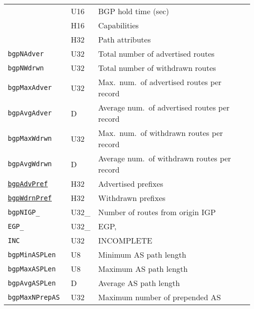 \documentclass[documentation]{subfiles}
\begin{document}
\begin{longtable}{>{\tt}lll>{\tt\small}l}
    \nameref{bgpHTime}                  & U16          & BGP hold time (sec)                           & \\
    \nameref{bgpCaps}                   & H16          & Capabilities                                  & \\
    \nameref{bgpPAttr}                  & H32          & Path attributes                               & \\
    bgpNAdver                           & U32          & Total number of advertised routes             & \\
    bgpNWdrwn                           & U32          & Total number of withdrawn routes              & \\
    bgpMaxAdver                         & U32          & Max.\ num.\ of advertised routes per record   & \\
    bgpAvgAdver                         & D            & Average num.\ of advertised routes per record & \\
    bgpMaxWdrwn                         & U32          & Max.\ num.\ of withdrawn routes per record    & \\
    bgpAvgWdrwn                         & D            & Average num.\ of withdrawn routes per record  & \\
    \hyperref[bgpPrefMask]{bgpAdvPref}  & H32          & Advertised prefixes                           & \\
    \hyperref[bgpPrefMask]{bgpWdrnPref} & H32          & Withdrawn prefixes                            & \\
    bgpNIGP\_                           & U32\_        & Number of routes from origin IGP              & \\
    \qquad EGP\_                        & \qquad U32\_ & \qquad EGP,                                   & \\
    \qquad INC                          & \qquad U32   & \qquad INCOMPLETE                             & \\
    bgpMinASPLen                        & U8           & Minimum AS path length                        & \\
    bgpMaxASPLen                        & U8           & Maximum AS path length                        & \\
    bgpAvgASPLen                        & D            & Average AS path length                        & \\
    bgpMaxNPrepAS                       & U32          & Maximum number of prepended AS                & \\

\end{longtable}
\end{document}
